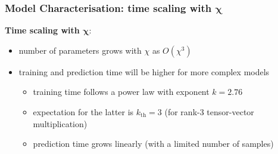 \documentclass[xcolor=table,8pt]{beamer}
\begin{document}
    \begin{frame}[t]
        \frametitle{Model Characterisation: time scaling with \( \boldsymbol{\chi} \)}

        \textbf{Time scaling with \( \boldsymbol{\chi} \)}:
        \begin{itemize}
            \item number of parameters grows with \( \chi \) as \( O(\chi^3) \)
            \item training and prediction time will be higher for more complex models
            \begin{itemize}
                \item training time follows a \alert{power law with exponent \( k = 2.76 \)}
                \item expectation for the latter is \( k_{\text{th}} = 3 \) (for rank-3 tensor-vector multiplication)
                \item prediction time grows linearly (with a limited number of samples)
            \end{itemize}
        \end{itemize}
        

\end{frame}
\end{document}
